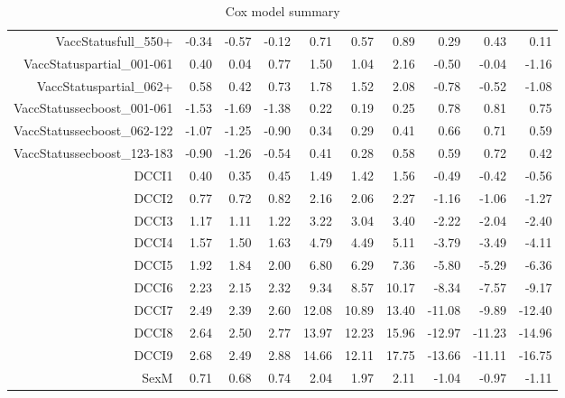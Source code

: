 \begin{table}[ht]
\begin{tabular}{rrrrrrrrrr}
  VaccStatusfull\_550+ & -0.34 & -0.57 & -0.12 & 0.71 & 0.57 & 0.89 & 0.29 & 0.43 & 0.11 \\ 
  VaccStatuspartial\_001-061 & 0.40 & 0.04 & 0.77 & 1.50 & 1.04 & 2.16 & -0.50 & -0.04 & -1.16 \\ 
  VaccStatuspartial\_062+ & 0.58 & 0.42 & 0.73 & 1.78 & 1.52 & 2.08 & -0.78 & -0.52 & -1.08 \\ 
  VaccStatussecboost\_001-061 & -1.53 & -1.69 & -1.38 & 0.22 & 0.19 & 0.25 & 0.78 & 0.81 & 0.75 \\ 
  VaccStatussecboost\_062-122 & -1.07 & -1.25 & -0.90 & 0.34 & 0.29 & 0.41 & 0.66 & 0.71 & 0.59 \\ 
  VaccStatussecboost\_123-183 & -0.90 & -1.26 & -0.54 & 0.41 & 0.28 & 0.58 & 0.59 & 0.72 & 0.42 \\ 
  DCCI1 & 0.40 & 0.35 & 0.45 & 1.49 & 1.42 & 1.56 & -0.49 & -0.42 & -0.56 \\ 
  DCCI2 & 0.77 & 0.72 & 0.82 & 2.16 & 2.06 & 2.27 & -1.16 & -1.06 & -1.27 \\ 
  DCCI3 & 1.17 & 1.11 & 1.22 & 3.22 & 3.04 & 3.40 & -2.22 & -2.04 & -2.40 \\ 
  DCCI4 & 1.57 & 1.50 & 1.63 & 4.79 & 4.49 & 5.11 & -3.79 & -3.49 & -4.11 \\ 
  DCCI5 & 1.92 & 1.84 & 2.00 & 6.80 & 6.29 & 7.36 & -5.80 & -5.29 & -6.36 \\ 
  DCCI6 & 2.23 & 2.15 & 2.32 & 9.34 & 8.57 & 10.17 & -8.34 & -7.57 & -9.17 \\ 
  DCCI7 & 2.49 & 2.39 & 2.60 & 12.08 & 10.89 & 13.40 & -11.08 & -9.89 & -12.40 \\ 
  DCCI8 & 2.64 & 2.50 & 2.77 & 13.97 & 12.23 & 15.96 & -12.97 & -11.23 & -14.96 \\ 
  DCCI9 & 2.68 & 2.49 & 2.88 & 14.66 & 12.11 & 17.75 & -13.66 & -11.11 & -16.75 \\ 
  SexM & 0.71 & 0.68 & 0.74 & 2.04 & 1.97 & 2.11 & -1.04 & -0.97 & -1.11 \\ 
   \hline
\end{tabular}
\caption{Cox model summary} 
\end{table}
